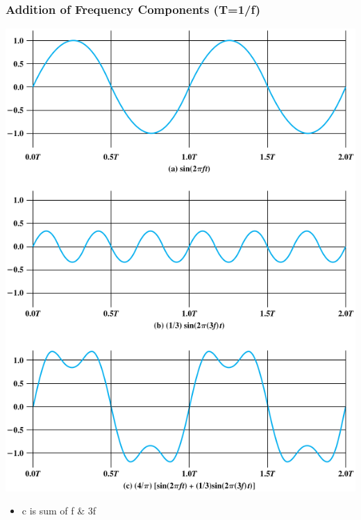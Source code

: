 \documentclass[pdflatex,compress]{beamer}
\begin{document}
\begin{frame}
	\frametitle{Addition of Frequency Components (T=1/f)}
	\begin{multicols}{2}
		\begin{center}
			\includegraphics[height=0.85\textheight]{img/img04}
		\end{center}
		\columnbreak
		\begin{itemize}
			\item c is sum of f \& 3f
		\end{itemize}
	\end{multicols}
\end{frame}
\end{document}
